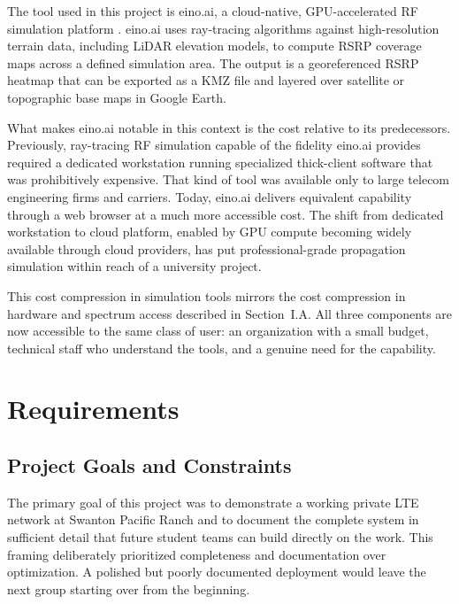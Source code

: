 \documentclass[
    left=1.5in,
    right=1.25in,
    top=1.25in,
    bottom=1.25in
]{CalPolySeniorProject}
\begin{document}
The tool used in this project is eino.ai, a cloud-native, GPU-accelerated RF
simulation platform \autocite{einoai2024}. eino.ai uses ray-tracing algorithms
against high-resolution terrain data, including LiDAR elevation models, to
compute RSRP coverage maps across a defined simulation area. The output is a
georeferenced RSRP heatmap that can be exported as a KMZ file and layered over
satellite or topographic base maps in Google Earth.

What makes eino.ai notable in this context is the cost relative to its
predecessors. Previously, ray-tracing RF simulation capable of the fidelity
eino.ai provides required a dedicated workstation running specialized thick-client
software that was prohibitively expensive. That kind of tool was available
only to large telecom engineering firms and carriers. Today, eino.ai delivers
equivalent capability through a web browser at a much more accessible cost. The shift
from dedicated workstation to cloud platform, enabled by GPU compute becoming
widely available through cloud providers, has put professional-grade propagation
simulation within reach of a university project.

This cost compression in simulation tools mirrors the cost compression in
hardware and spectrum access described in Section~I.A. All three
components are now accessible to the same class of user: an organization with a
small budget, technical staff who understand the tools, and a genuine need for
the capability.

\section{Requirements}

\subsection{Project Goals and Constraints}

The primary goal of this project was to demonstrate a working private LTE
network at Swanton Pacific Ranch and to document the complete system in
sufficient detail that future student teams can build directly on the work. This
framing deliberately prioritized completeness and documentation over
optimization. A polished but poorly documented deployment would leave the next
group starting over from the beginning.
\end{document}
